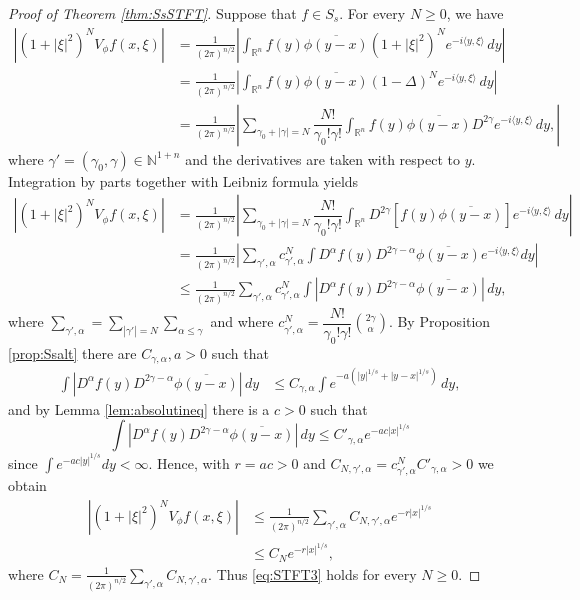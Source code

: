 \documentclass[11pt,a4paper,reqno]{amsart}
\numberwithin{equation}{section}
\theoremstyle{definition}
\theoremstyle{definition}
\begin{document}
\begin{proof}[Proof of Theorem \ref{thm:SsSTFT}]
Suppose that $f\in S_s$. For every $N\geq 0$, we have
\begin{align*}
    |(1+|\xi|^2)^N V_\phi f(x,\xi) | &= \frac{1}{(2\pi)^{n/2}} \left| \int_{\mathbb{R}^n} f(y) \overline{\phi(y-x)} (1+|\xi|^2)^N e^{-i\langle y,\xi \rangle} \, d y \right| \\
    &=\frac{1}{(2\pi)^{n/2}} \left| \int_{\mathbb{R}^n} f(y) \overline{\phi(y-x)} (1-\Delta)^N e^{-i\langle y,\xi \rangle} \, d y \right| \\
    &= \frac{1}{(2\pi)^{n/2}} \left| \sum_{\gamma_0+|\gamma|=N} \dfrac{N!}{\gamma_0! \gamma!} \int_{\mathbb{R}^n} f(y) \overline{\phi(y-x)} D^{2\gamma} e^{-i\langle y, \xi \rangle} \, d y, \right|
\end{align*}
where $\gamma'=(\gamma_0,\gamma)\in \mathbb{N}^{1+n}$ and the derivatives are taken with respect to $y$. Integration by parts together with Leibniz formula yields
\begin{align*}
    |(1+|\xi|^2)^N V_\phi f(x,\xi) | &= \frac{1}{(2\pi)^{n/2}} \left|\sum_{\gamma_0+|\gamma|=N} \dfrac{N!}{\gamma_0! \gamma!} \int_{\mathbb{R}^n} D^{2\gamma} \left[ f(y) \overline{\phi(y-x)} \right] e^{-i \langle y, \xi \rangle}\, d y \right|
    \\ &=\frac{1}{(2\pi)^{n/2}} \left|\sum_{\gamma',\alpha}  c^N_{\gamma',\alpha} \int D^{\alpha} f(y) D^{2\gamma-\alpha} \overline{\phi(y-x)} e^{-i\langle y, \xi\rangle} d y \right| \\
    &\leq \frac{1}{(2\pi)^{n/2}} \sum_{\gamma',\alpha} c^N_{\gamma',\alpha} \int\left| D^{\alpha} f(y) D^{2\gamma-\alpha} \overline{\phi(y-x)} \right| \, d y,
\end{align*}
where $\sum_{\gamma',\alpha}=\sum_{|\gamma'|=N} \sum_{\alpha\leq \gamma}$ and where $c^N_{\gamma',\alpha} = \dfrac{N!}{\gamma_0! \gamma!}\binom{2\gamma}{\alpha}$. By Proposition \ref{prop:Ssalt} there are $C_{\gamma,\alpha}, a>0$ such that
\begin{align*}
    \int\left| D^{\alpha} f(y) D^{2\gamma-\alpha} \overline{\phi(y-x)} \right| \, d y &\leq C_{\gamma,\alpha} \int e^{- a(|y|^{1/s}+|y-x|^{1/s})} \, d y,
\end{align*}
and by Lemma \ref{lem:absolutineq} there is a $c>0$ such that
\begin{equation*}
    \int\left| D^{\alpha} f(y) D^{2\gamma-\alpha} \overline{\phi(y-x)} \right| \, d y \leq C'_{\gamma,\alpha} e^{-ac|x|^{1/s}}
\end{equation*}
since $\int e^{-ac|y|^{1/s}} d y < \infty$. Hence, with $r=a c>0$ and $C_{N,\gamma',\alpha} = c^N_{\gamma',\alpha}C'_{\gamma,\alpha}>0$ we obtain
\begin{align*}
    |(1+|\xi|^2)^N V_\phi f(x,\xi) | &\leq \frac{1}{(2\pi)^{n/2}} \sum_{\gamma',\alpha}  C_{N,\gamma',\alpha} e^{-r|x|^{1/s}} \\
    &\leq C_N e^{-r|x|^{1/s}},
\end{align*}
where $C_N = \frac{1}{(2\pi)^{n/2}}\sum_{\gamma',\alpha} C_{N,\gamma',\alpha}$. Thus \eqref{eq:STFT3} holds for every $N\geq 0$.


\end{proof}
\end{document}
